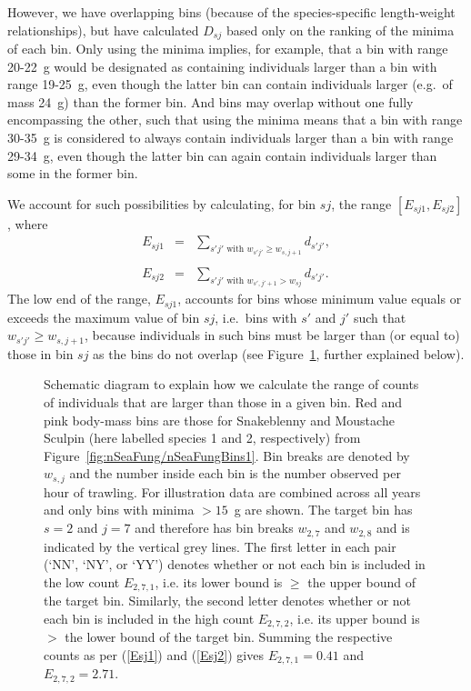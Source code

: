 \documentclass[12pt, letter]{article}
\newcommand{\eb}{\begin{eqnarray}}
\newcommand{\ee}{\end{eqnarray}}
\begin{document}
However, we have overlapping bins (because of the species-specific
length-weight relationships), but have calculated $D_{sj}$ based only on the
ranking of the minima of each bin. Only using the minima implies, for example, that
a bin with range 20-22~g would be designated as containing individuals
larger than a bin with range 19-25~g, even though the latter bin can contain
individuals larger (e.g.~of mass 24~g) than the former bin. And bins may overlap without one
fully encompassing the other, such that using the minima means that a bin with range 30-35~g is considered
to always contain individuals larger than a bin with range 29-34~g, even though
the latter bin can again contain individuals larger than some in the former bin.

We account for such possibilities by calculating, for bin $sj$, the range
$[E_{sj1}, E_{sj2}]$, where
\eb
E_{sj1} & = & \sum_{s'j' {\mbox{~with~}} w_{s'j'} \geq w_{s,j+1}} d_{s'j'},
\label{Esj1}\\
\nonumber~ \\
E_{sj2} & = & \sum_{s'j' {\mbox{~with~}} w_{s',j'+1} > w_{sj}} d_{s'j'}.
\label{Esj2}
\ee
The low end of the range, $E_{sj1}$, accounts for bins whose minimum value
equals or exceeds
the maximum value of bin $sj$, i.e.~bins with $s'$ and $j'$ such that
$w_{s'j'} \geq w_{s,j+1}$, because individuals in such bins
must be larger than (or equal to)
those in bin $sj$ as the bins do not overlap
(see Figure~\ref{fig:binCountRangeSchematic}, further explained below).
%
\begin{figure}[tp]
\begin{center}
\end{center}
\caption{Schematic diagram to explain how we calculate
  the range of counts of individuals that are larger than those in a given bin.
  Red and pink body-mass bins are those for Snakeblenny and Moustache Sculpin
  (here labelled species 1 and 2, respectively) from
  Figure~\ref{fig:nSeaFung/nSeaFungBins1}.
  Bin breaks are denoted by $w_{s,j}$
  and the number inside each bin is the number observed per hour of trawling.
  For illustration data are combined across all years and only bins with
  minima $>15$~g are shown. The target bin has $s=2$ and $j=7$ and therefore
  has bin breaks $w_{2,7}$ and $w_{2,8}$ and is indicated by the vertical grey
  lines.
  The first letter in each pair (`NN', `NY', or `YY') denotes whether or not
  each bin is included in the low count $E_{2,7,1}$, i.e. its lower bound is
  $\geq$ the upper bound of the target bin. Similarly, the second letter denotes
  whether or not each bin is included in the high count $E_{2,7,2}$, i.e.
  its upper bound is $>$ the lower bound of the target bin. Summing the
  respective counts as per (\ref{Esj1}) and (\ref{Esj2}) gives
  $E_{2,7,1} = 0.41$ and $E_{2,7,2} = 2.71$.
  }
  \label{fig:binCountRangeSchematic}
\end{figure}
\end{document}
